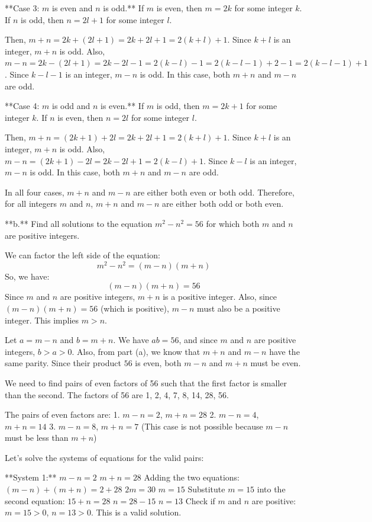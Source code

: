 \documentclass{article}
\begin{document}
**Case 3: $m$ is even and $n$ is odd.**
If $m$ is even, then $m = 2k$ for some integer $k$.
If $n$ is odd, then $n = 2l+1$ for some integer $l$.

Then, $m+n = 2k + (2l+1) = 2k + 2l + 1 = 2(k+l) + 1$. Since $k+l$ is an integer, $m+n$ is odd.
Also, $m-n = 2k - (2l+1) = 2k - 2l - 1 = 2(k-l) - 1 = 2(k-l-1) + 2 - 1 = 2(k-l-1) + 1$. Since $k-l-1$ is an integer, $m-n$ is odd.
In this case, both $m+n$ and $m-n$ are odd.

**Case 4: $m$ is odd and $n$ is even.**
If $m$ is odd, then $m = 2k+1$ for some integer $k$.
If $n$ is even, then $n = 2l$ for some integer $l$.

Then, $m+n = (2k+1) + 2l = 2k + 2l + 1 = 2(k+l) + 1$. Since $k+l$ is an integer, $m+n$ is odd.
Also, $m-n = (2k+1) - 2l = 2k - 2l + 1 = 2(k-l) + 1$. Since $k-l$ is an integer, $m-n$ is odd.
In this case, both $m+n$ and $m-n$ are odd.

In all four cases, $m+n$ and $m-n$ are either both even or both odd. Therefore, for all integers $m$ and $n$, $m+n$ and $m-n$ are either both odd or both even.

**b.** Find all solutions to the equation $m^2 - n^2 = 56$ for which both $m$ and $n$ are positive integers.

We can factor the left side of the equation:
$$ m^2 - n^2 = (m-n)(m+n) $$
So, we have:
$$ (m-n)(m+n) = 56 $$
Since $m$ and $n$ are positive integers, $m+n$ is a positive integer. Also, since $(m-n)(m+n) = 56$ (which is positive), $m-n$ must also be a positive integer. This implies $m > n$.

Let $a = m-n$ and $b = m+n$. We have $ab = 56$, and since $m$ and $n$ are positive integers, $b > a > 0$.
Also, from part (a), we know that $m+n$ and $m-n$ have the same parity. Since their product $56$ is even, both $m-n$ and $m+n$ must be even.

We need to find pairs of even factors of 56 such that the first factor is smaller than the second. The factors of 56 are 1, 2, 4, 7, 8, 14, 28, 56.

The pairs of even factors are:
1. $m-n = 2$, $m+n = 28$
2. $m-n = 4$, $m+n = 14$
3. $m-n = 8$, $m+n = 7$ (This case is not possible because $m-n$ must be less than $m+n$)

Let's solve the systems of equations for the valid pairs:

**System 1:**
$m-n = 2$
$m+n = 28$
Adding the two equations:
$(m-n) + (m+n) = 2 + 28$
$2m = 30$
$m = 15$
Substitute $m=15$ into the second equation:
$15 + n = 28$
$n = 28 - 15$
$n = 13$
Check if $m$ and $n$ are positive: $m=15 > 0$, $n=13 > 0$. This is a valid solution.
\end{document}
